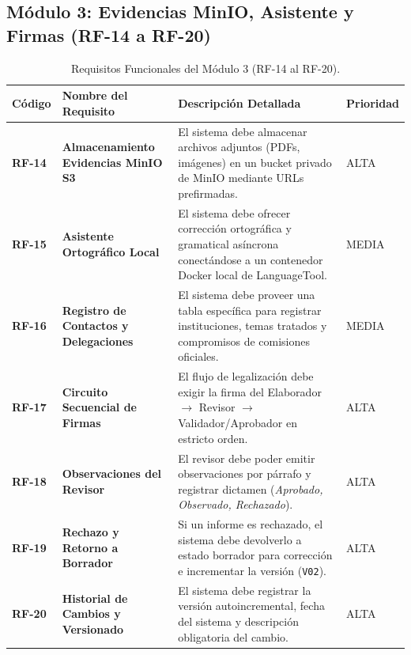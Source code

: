 \documentclass[12pt,a4paper]{article}
\begin{document}
\subsection{Módulo 3: Evidencias MinIO, Asistente y Firmas (RF-14 a RF-20)}
\begin{table}[htbp]
\centering
\small
\begin{tabularx}{\textwidth}{|>{\hsize=0.35\hsize\bfseries\centering\arraybackslash}X|>{\hsize=0.85\hsize\bfseries}X|>{\hsize=1.5\hsize}X|>{\hsize=0.3\hsize\centering\arraybackslash}X|}
    \hline
    \rowcolor{tableheader}
    Código & Nombre del Requisito & Descripción Detallada & Prioridad \\
    \hline
    RF-14 & Almacenamiento Evidencias MinIO S3 & El sistema debe almacenar archivos adjuntos (PDFs, imágenes) en un bucket privado de MinIO mediante URLs prefirmadas. & ALTA \\
    \hline
    RF-15 & Asistente Ortográfico Local & El sistema debe ofrecer corrección ortográfica y gramatical asíncrona conectándose a un contenedor Docker local de LanguageTool. & MEDIA \\
    \hline
    RF-16 & Registro de Contactos y Delegaciones & El sistema debe proveer una tabla específica para registrar instituciones, temas tratados y compromisos de comisiones oficiales. & MEDIA \\
    \hline
    RF-17 & Circuito Secuencial de Firmas & El flujo de legalización debe exigir la firma del Elaborador $\rightarrow$ Revisor $\rightarrow$ Validador/Aprobador en estricto orden. & ALTA \\
    \hline
    RF-18 & Observaciones del Revisor & El revisor debe poder emitir observaciones por párrafo y registrar dictamen (\textit{Aprobado, Observado, Rechazado}). & ALTA \\
    \hline
    RF-19 & Rechazo y Retorno a Borrador & Si un informe es rechazado, el sistema debe devolverlo a estado borrador para corrección e incrementar la versión (\texttt{V02}). & ALTA \\
    \hline
    RF-20 & Historial de Cambios y Versionado & El sistema debe registrar la versión autoincremental, fecha del sistema y descripción obligatoria del cambio. & ALTA \\
    \hline
\end{tabularx}
\caption{Requisitos Funcionales del Módulo 3 (RF-14 al RF-20).}
\label{tab:s1_03_rf_m3}
\end{table}
\end{document}
